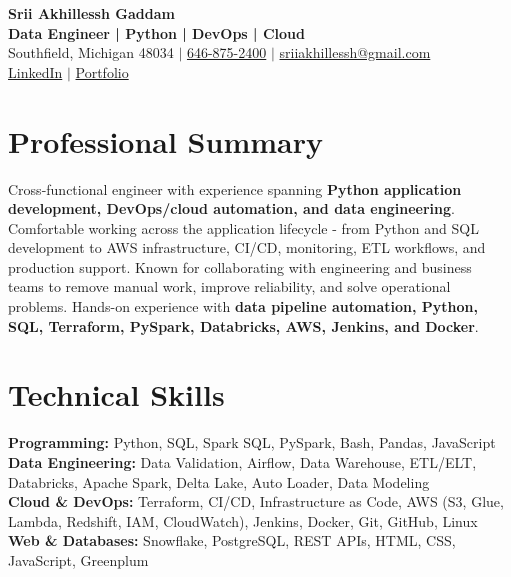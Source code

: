 \documentclass[letterpaper,10pt]{article}
\begin{document}
\fontsize{9.35pt}{10.45pt}\selectfont

\begin{center}
    {\LARGE \textbf{Srii Akhillessh Gaddam}} \\[-1pt]
    \textbf{Data Engineer | Python | DevOps | Cloud} \\[2pt]
    Southfield, Michigan 48034 $|$
    \href{tel:6468752400}{646-875-2400} $|$
    \href{mailto:sriiakhillessh@gmail.com}{sriiakhillessh@gmail.com} \\[1pt]
    \href{https://www.linkedin.com/in/srii-akhiilessh-gaddam-b48668191/}{LinkedIn} $|$
    \href{https://sriiakhillesshg.github.io/portfolio/}{Portfolio}
\end{center}
\vspace{-8pt}

\section{Professional Summary}
\small{Cross-functional engineer with experience spanning \textbf{Python application development, DevOps/cloud automation, and data engineering}. Comfortable working across the application lifecycle - from Python and SQL development to AWS infrastructure, CI/CD, monitoring, ETL workflows, and production support. Known for collaborating with engineering and business teams to remove manual work, improve reliability, and solve operational problems. Hands-on experience with \textbf{data pipeline automation, Python, SQL, Terraform, PySpark, Databricks, AWS, Jenkins, and Docker}.}

\section{Technical Skills}
\small{
\textbf{Programming:} Python, SQL, Spark SQL, PySpark, Bash, Pandas, JavaScript \\
\textbf{Data Engineering:} Data Validation, Airflow, Data Warehouse, ETL/ELT, Databricks, Apache Spark, Delta Lake, Auto Loader, Data Modeling \\
\textbf{Cloud \& DevOps:} Terraform, CI/CD, Infrastructure as Code, AWS (S3, Glue, Lambda, Redshift, IAM, CloudWatch), Jenkins, Docker, Git, GitHub, Linux \\
\textbf{Web \& Databases:} Snowflake, PostgreSQL, REST APIs, HTML, CSS, JavaScript, Greenplum
}
\end{document}
